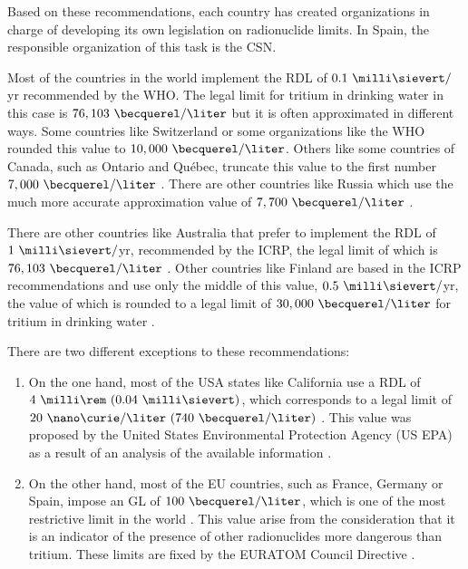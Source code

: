 Based on these recommendations, each country has created organizations in charge of developing its own legislation on radionuclide limits. In Spain, the responsible organization of this task is the CSN.

Most of the countries in the world implement the RDL of $0.1~\milli\sievert/$yr recommended by the WHO. The legal limit for tritium in drinking water in this case is $76,103~\becquerel/\liter$  but it is often approximated in different ways. Some countries like Switzerland \cite{Switzerland_GL} or some organizations like the WHO \cite{WHO_GL} rounded this value to $10,000~\becquerel/\liter$. Others like some countries of Canada, such as Ontario and Québec, truncate this value to the first number $7,000~\becquerel/\liter$ \cite{Ontario_GL, Quebec_GL}. There are other countries like Russia which use the much more accurate approximation value of $7,700~\becquerel/\liter$ \cite{Russia_GL}.

There are other countries like Australia that prefer to implement the RDL of $1~\milli\sievert/$yr, recommended by the ICRP, the legal limit of which is $76,103~\becquerel/\liter$ \cite{Australia_GL}. Other countries like Finland are based in the ICRP recommendations and use only the middle of this value, $0.5~\milli\sievert/$yr, the value of which is rounded to a legal limit of $30,000~\becquerel/\liter$ for tritium in drinking water \cite{Finland_GL}.

There are two different exceptions to these recommendations:
\begin{enumerate}
\item{} On the one hand, most of the USA states like California use a RDL of $4~\milli\rem~(0.04~\milli\sievert)$, which corresponds to a legal limit of $20~\nano\curie/\liter~(740~\becquerel/\liter)$ \cite{California_GL}. This value was proposed by the United States Environmental Protection Agency (US EPA) as a result of an analysis of the available information \cite{USEPA_GL}.

\item{} On the other hand, most of the EU countries, such as France, Germany or Spain, impose an GL of $100~\becquerel/\liter$, which is one of the most restrictive limit in the world \cite{France_GL, Germany_GL, Spain_GL}. This value arise from the consideration that it is an indicator of the presence of other radionuclides more dangerous than tritium. These limits are fixed by the EURATOM Council Directive \cite{EURATOM_GL}. 
\end{enumerate}

